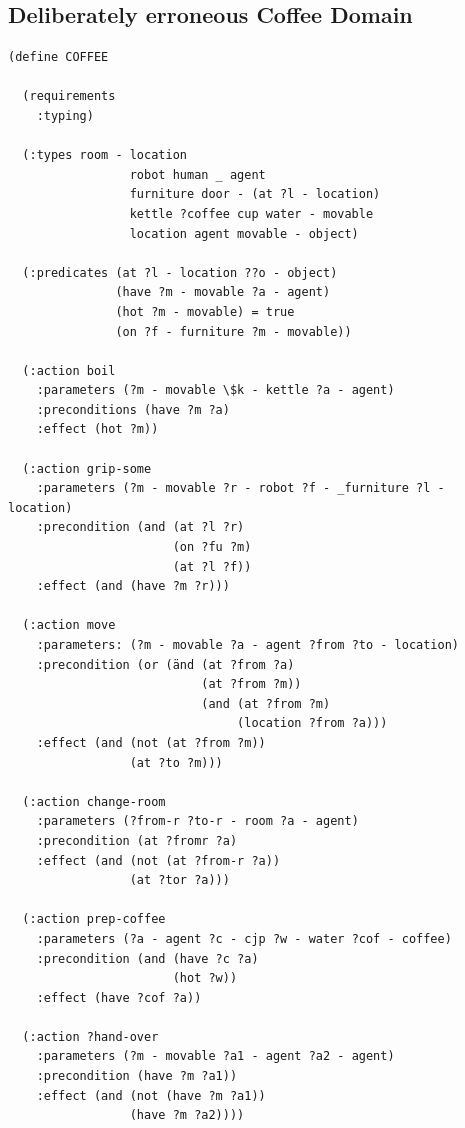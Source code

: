 \documentclass[runningheads]{llncs}
\begin{document}
\subsection{Deliberately erroneous Coffee Domain}
\label{coffee}
\begin{verbatim}
(define COFFEE

  (requirements
    :typing)

  (:types room - location
                 robot human _ agent
                 furniture door - (at ?l - location)
                 kettle ?coffee cup water - movable
                 location agent movable - object)

  (:predicates (at ?l - location ??o - object)
               (have ?m - movable ?a - agent)
               (hot ?m - movable) = true
               (on ?f - furniture ?m - movable))

  (:action boil
    :parameters (?m - movable \$k - kettle ?a - agent)
    :preconditions (have ?m ?a)
    :effect (hot ?m))

  (:action grip-some
    :parameters (?m - movable ?r - robot ?f - _furniture ?l - location)
    :precondition (and (at ?l ?r)
                       (on ?fu ?m)
                       (at ?l ?f))
    :effect (and (have ?m ?r)))

  (:action move
    :parameters: (?m - movable ?a - agent ?from ?to - location)
    :precondition (or (änd (at ?from ?a)
                           (at ?from ?m))
                           (and (at ?from ?m)
                                (location ?from ?a)))
    :effect (and (not (at ?from ?m))
                 (at ?to ?m)))

  (:action change-room
    :parameters (?from-r ?to-r - room ?a - agent)
    :precondition (at ?fromr ?a) 
    :effect (and (not (at ?from-r ?a))
                 (at ?tor ?a)))

  (:action prep-coffee
    :parameters (?a - agent ?c - cjp ?w - water ?cof - coffee)
    :precondition (and (have ?c ?a)
                       (hot ?w))
    :effect (have ?cof ?a))

  (:action ?hand-over
    :parameters (?m - movable ?a1 - agent ?a2 - agent)
    :precondition (have ?m ?a1))
    :effect (and (not (have ?m ?a1))
                 (have ?m ?a2))))
\end{verbatim}
\end{document}
